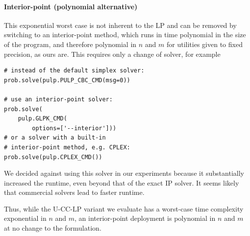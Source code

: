\documentclass[letterpaper]{article} %
\newcommand{\LP}{\textsc{U-CC-LP}}
\begin{document}
\paragraph{Interior-point (polynomial alternative)} This exponential worst case is not inherent to the LP and can be removed by switching to an interior-point method, which runs in time polynomial in the size of the program, and therefore polynomial in \(n\) and \(m\) for utilities given to fixed precision, as ours are.
This requires only a change of solver, for example
\begin{verbatim}
# instead of the default simplex solver:
prob.solve(pulp.PULP_CBC_CMD(msg=0))

# use an interior-point solver:
prob.solve(
    pulp.GLPK_CMD(
        options=['--interior']))
# or a solver with a built-in
# interior-point method, e.g. CPLEX:
prob.solve(pulp.CPLEX_CMD())
\end{verbatim}
We decided against using this solver in our experiments because it substantially increased the runtime, even beyond that of the exact IP solver.
It seems likely that commercial solvers lead to faster runtime.

Thus, while the \LP{} variant we evaluate has a worst-case time complexity exponential in \(n\) and \(m\), an interior-point deployment is polynomial in \(n\) and \(m\) at no change to the formulation.
\end{document}
